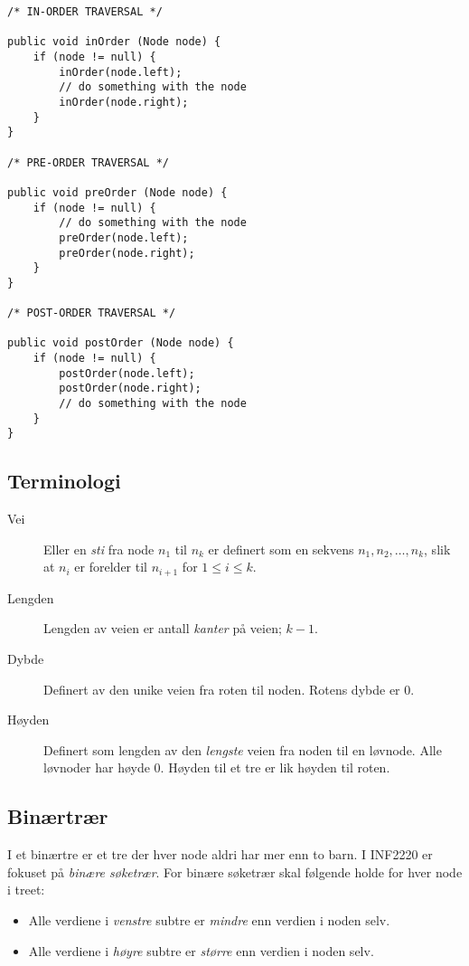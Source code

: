 \documentclass[11pt,a4paper]{article}
\begin{document}
\begin{lstlisting}
/* IN-ORDER TRAVERSAL */

public void inOrder (Node node) {
	if (node != null) {
		inOrder(node.left);
		// do something with the node
		inOrder(node.right);
	}
}

/* PRE-ORDER TRAVERSAL */

public void preOrder (Node node) {
	if (node != null) {
		// do something with the node
		preOrder(node.left);
		preOrder(node.right);
	}
}

/* POST-ORDER TRAVERSAL */

public void postOrder (Node node) {
	if (node != null) {
		postOrder(node.left);
		postOrder(node.right);
		// do something with the node
	}
}
\end{lstlisting}

\subsection{Terminologi}
\begin{description}
\item[Vei] Eller en \textit{sti} fra node $n_1$ til $n_k$ er definert som en sekvens $n_1, n_2, \dots, n_k$, slik at $n_i$ er forelder til $n_{i+1}$ for $1 \leq i \leq k$.
\item[Lengden] Lengden av veien er antall \textit{kanter} på veien; $k-1$.
\item[Dybde] Definert av den unike veien fra roten til noden. Rotens dybde er 0.
\item[Høyden] Definert som lengden av den \textit{lengste} veien fra noden til en løvnode. Alle løvnoder har høyde 0. Høyden til et tre er lik høyden til roten.
\end{description}


\subsection{Binærtrær}
I et binærtre er et tre der hver node aldri har mer enn to barn. I INF2220 er fokuset på \textit{binære søketrær}. For binære søketrær skal følgende holde for hver node i treet:
\begin{itemize}
\item
Alle verdiene i \textit{venstre} subtre er \textit{mindre} enn verdien i noden selv.
\item
Alle verdiene i \textit{høyre} subtre er \textit{større} enn verdien i noden selv.
\end{itemize}
\end{document}
